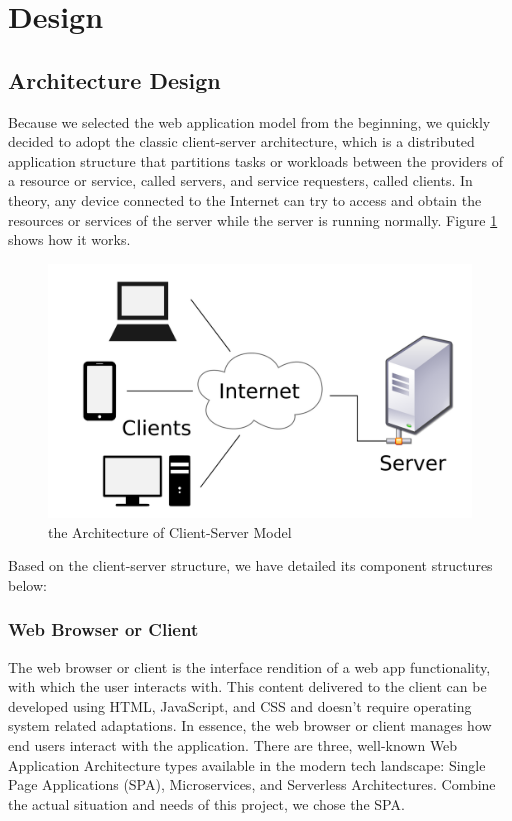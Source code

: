 \section{Design}
\label{sec:Design}

\subsection{Architecture Design}
Because we selected the web application model from the beginning, we quickly decided to adopt the classic client-server architecture, which is a distributed application structure that partitions tasks or workloads between the providers of a resource or service, called servers, and service requesters, called clients. In theory, any device connected to the Internet can try to access and obtain the resources or services of the server while the server is running normally. Figure \ref{Client-Server Architecture} shows how it works.

\begin{figure}[htb]
\centering
\includegraphics[width=\textwidth]{section03/assets/client_server.png}
\caption[the Architecture of Client-Server Model]{\label{Client-Server Architecture}the Architecture of Client-Server Model}
\end{figure}

Based on the client-server structure, we have detailed its component structures below:
\subsubsection{Web Browser or Client}
The web browser or client is the interface rendition of a web app functionality, with which the user interacts with. This content delivered to the client can be developed using HTML, JavaScript, and CSS and doesn’t require operating system related adaptations. In essence, the web browser or client manages how end users interact with the application.
There are three, well-known Web Application Architecture types available in the modern tech landscape: Single Page Applications (SPA), Microservices, and Serverless Architectures. Combine the actual situation and needs of this project, we chose the SPA.

